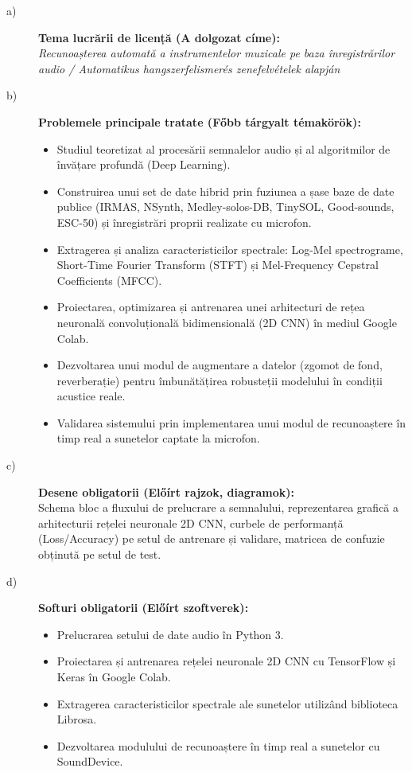 \begin{description}
  \item[\normalfont a)] {\bfseries Tema lucrării de licență (A dolgozat címe):}\\
    \textit{Recunoașterea automată a instrumentelor muzicale pe baza înregistrărilor audio / Automatikus hangszerfelismerés zenefelvételek alapján}
    
  \item[\normalfont b)] {\bfseries Problemele principale tratate (Főbb tárgyalt témakörök):}
    \begin{itemize}
      \item Studiul teoretizat al procesării semnalelor audio și al algoritmilor de învățare profundă (Deep Learning).
      \item Construirea unui set de date hibrid prin fuziunea a șase baze de date publice (IRMAS, NSynth, Medley-solos-DB, TinySOL, Good-sounds, ESC-50) și înregistrări proprii realizate cu microfon.
      \item Extragerea și analiza caracteristicilor spectrale: Log-Mel spectrograme, Short-Time Fourier Transform (STFT) și Mel-Frequency Cepstral Coefficients (MFCC).
      \item Proiectarea, optimizarea și antrenarea unei arhitecturi de rețea neuronală convoluțională bidimensională (2D CNN) în mediul Google Colab.
      \item Dezvoltarea unui modul de augmentare a datelor (zgomot de fond, reverberație) pentru îmbunătățirea robusteții modelului în condiții acustice reale.
      \item Validarea sistemului prin implementarea unui modul de recunoaștere în timp real a sunetelor captate la microfon.
    \end{itemize}
    
  \item[\normalfont c)] {\bfseries Desene obligatorii (Előírt rajzok, diagramok):}\\
    Schema bloc a fluxului de prelucrare a semnalului, reprezentarea grafică a arhitecturii rețelei neuronale 2D CNN, curbele de performanță (Loss/Accuracy) pe setul de antrenare și validare, matricea de confuzie obținută pe setul de test.
    
  \item[\normalfont d)] {\bfseries Softuri obligatorii (Előírt szoftverek):}
    \begin{itemize}
      \item Prelucrarea setului de date audio în Python 3.
      \item Proiectarea și antrenarea rețelei neuronale 2D CNN cu TensorFlow și Keras în Google Colab.
      \item Extragerea caracteristicilor spectrale ale sunetelor utilizând biblioteca Librosa.
      \item Dezvoltarea modulului de recunoaștere în timp real a sunetelor cu SoundDevice.
    \end{itemize}
    

\end{description}
